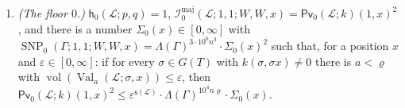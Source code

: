 \documentclass[11pt,a4paper]{article}
\newcommand{\m}[1]{\mbox{$#1$}}        %
\theoremstyle{plainx}
\theoremstyle{uprightx}
\newcommand{\cL}{\mathcal{L}}                       %
\newcommand{\GT}[1]{G(#1)}                          %
\newcommand{\gL}[1]{g_{#1}}                         %
\newcommand{\Lam}[1]{\Lambda(#1)}                   %
\newcommand{\szl}[3]{\operatorname{sz}_{#1}(#2)\le #3} %
\newcommand{\vexp}[1]{\mathsf{s}(#1)}               %
\newcommand{\Val}[4]{\operatorname{Val}_{#2}(#1;#3,#4)} %
\newcommand{\Pv}[5]{\mathsf{Pv}_{#2}(#1;#3)(#4,#5)} %
\newcommand{\hdens}[4]{\mathsf{h}_{#2}(#1;#3,#4)}   %
\newcommand{\fmaj}[7]{\mathcal{I}^{\mathrm{maj}}_{#2}(#1;#3,#4;#5,#6,#7)} %
\newcommand{\snp}[7]{\operatorname{SNP}_{#2}(#1;#3,#4;#5,#6,#7)} %
\newcommand{\vol}{\operatorname{vol}}
\begin{document}
{\begin{enumerate}[label=\textup{(\alph*)},leftmargin=2.3em,itemsep=1pt]
every $a$ with \m{j\le a<\varrho} there is a unit \m{c\in\Val{\cL}{a}{x}{y}} with \m{\szl{\Gamma''}{c^{-1}}{1}}. Then
\m{\szl{\Gamma''}{\gL{\cL}^{-1}(y-1)}{99n}}.
\item \emph{(The floor $0$.)} \m{\hdens{\cL}{0}{p}{q}=1},
\m{\fmaj{\cL}{0}{1}{1}{W}{W}{x}=\Pv{\cL}{0}{k}{1}{x}^2}, and there is a number \m{\Sigma_0(x)\in[0,\infty]} with
\m{\snp{\Gamma}{0}{1}{1}{W}{W}{x}=\Lam{\Gamma}^{3\cdot10^6n^3}\cdot\Sigma_0(x)^2} such that, for a position $x$ and
\m{\varepsilon\in[0,\infty]}: if for every \m{\sigma\in\GT{T}} with \m{k(\sigma,\sigma x)\ne0} there is \m{a<\varrho} with
\m{\vol(\Val{\cL}{a}{\sigma}{x})\le\varepsilon}, then
\m{\Pv{\cL}{0}{k}{1}{x}^2\le\varepsilon^{\vexp{\cL}}\cdot\Lam{\Gamma}^{10^4n\varrho}\cdot\Sigma_0(x)}.
\end{enumerate}}
\end{document}
